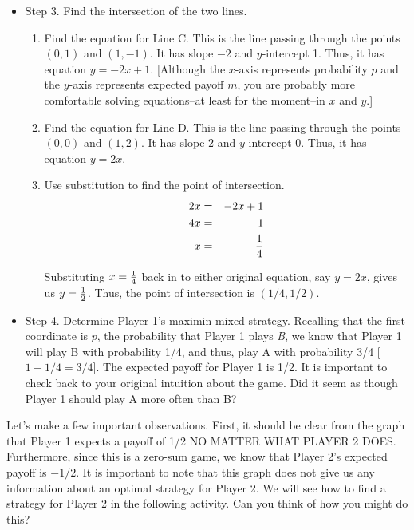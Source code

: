 \begin{itemize}
\item Step 3. Find the intersection of the two lines.
\begin{enumerate}
\item Find the equation for Line C. This is the line passing through the points $(0, 1)$ and $(1, -1)$. It has slope $-2$ and $y$-intercept 1. Thus, it has equation $y=-2x+1$. [Although the $x$-axis represents probability $p$ and the $y$-axis represents expected payoff $m$, you are probably more comfortable solving equations--at least for the moment--in $x$ and $y$.]
\item Find the equation for Line D. This is the line passing through the points $(0, 0)$ and $(1, 2)$. It has slope $2$ and $y$-intercept 0. Thus, it has equation $y=2x$. 
\item Use substitution to find the point of intersection. 
\begin{eqnarray*}
2x &=&-2x+1\\
4x &=& 1\\
x&=&{1\over 4}
\end{eqnarray*}

Substituting $x={1\over 4}$ back in to either original equation, say $y=2x$, gives us $y={1\over 2}$. Thus, the point of intersection is $(1/4, 1/2)$. 
\end{enumerate}

\item Step 4. Determine Player 1's maximin mixed strategy. Recalling that the first coordinate is $p$, the probability that Player 1 plays {\it B}, we know that Player 1 will play B with probability 1/4, and thus, play A with probability 3/4 [$1-1/4=3/4$]. The expected payoff for Player 1 is 1/2. It is important to check back to your original intuition about the game. Did it seem as though Player 1 should play A more often than B?


\end{itemize}

Let's make a few important observations. First, it should be clear from the graph that Player 1 expects a payoff of 1/2 NO MATTER WHAT PLAYER 2 DOES. Furthermore, since this is a zero-sum game, we know that Player 2's expected payoff is $-1/2$. It is important to note that this graph does not give us any information about an optimal strategy for Player 2. We will see how to find a strategy for Player 2 in the following activity. Can you think of how you might do this?
